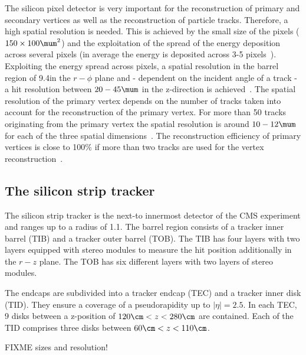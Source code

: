 The silicon pixel detector is very important for the reconstruction of primary and secondary vertices as well as the reconstruction of particle tracks.
Therefore, a high spatial resolution is needed.
This is achieved by the small size of the pixels ($ 150 \times 100 \mum^2$) and the exploitation of the spread of the energy deposition across several pixels (in average the energy is deposited across 3-5 pixels~\cite{bib:TWIKI:PixelClusterSize}).
Exploiting the energy spread across pixels, a spatial resolution in the barrel region of 9.4\mum in the $r - \phi$ plane and - dependent on the incident angle of a track - a hit resolution between $20-45\mum$ in the z-direction is achieved~\cite{bib:CMS:tracking_8TeV}. 
The spatial resolution of the primary vertex depends on the number of tracks taken into account for the reconstruction of the primary vertex.
For more than 50 tracks originating from the primary vertex the spatial resolution is around $10-12\mum$ for each of the three spatial dimensions~\cite{bib:CMS:tracking_8TeV}.
The reconstruction efficiency of primary vertices is close to 100\% if more than two tracks are used for the vertex reconstruction~\cite{bib:CMS:tracking_8TeV}.


\subsection*{The silicon strip tracker}
The silicon strip tracker is the next-to innermost detector of the CMS experiment and ranges up to a radius of 1.1\m.
The barrel region consists of a tracker inner barrel (TIB) and a tracker outer barrel (TOB).
The TIB has four layers with two layers equipped with stereo modules to measure the hit position additionally in the $r-z$ plane.
The TOB has six different layers with two layers of stereo modules. 

The endcaps are subdivided into a tracker endcap (TEC) and a tracker inner disk (TID).
They ensure a coverage of a pseudorapidity up to $|\eta|=2.5$.
In each TEC, 9 disks between a z-position of $120\cm < z < 280\cm$ are contained.
Each of the TID comprises three disks between $60\cm < z < 110\cm$.

FIXME sizes and resolution!

